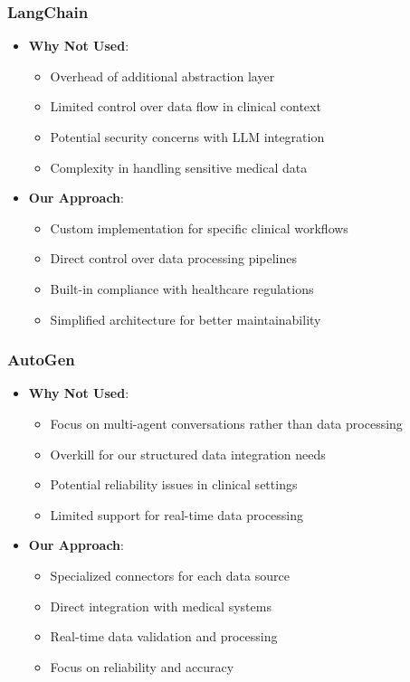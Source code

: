\documentclass[12pt]{article}
\begin{document}
\subsubsection{LangChain}
\begin{itemize}
    \item \textbf{Why Not Used}:
    \begin{itemize}
        \item Overhead of additional abstraction layer
        \item Limited control over data flow in clinical context
        \item Potential security concerns with LLM integration
        \item Complexity in handling sensitive medical data
    \end{itemize}
    \item \textbf{Our Approach}:
    \begin{itemize}
        \item Custom implementation for specific clinical workflows
        \item Direct control over data processing pipelines
        \item Built-in compliance with healthcare regulations
        \item Simplified architecture for better maintainability
    \end{itemize}
\end{itemize}

\subsubsection{AutoGen}
\begin{itemize}
    \item \textbf{Why Not Used}:
    \begin{itemize}
        \item Focus on multi-agent conversations rather than data processing
        \item Overkill for our structured data integration needs
        \item Potential reliability issues in clinical settings
        \item Limited support for real-time data processing
    \end{itemize}
    \item \textbf{Our Approach}:
    \begin{itemize}
        \item Specialized connectors for each data source
        \item Direct integration with medical systems
        \item Real-time data validation and processing
        \item Focus on reliability and accuracy
    \end{itemize}
\end{itemize}
\end{document}

